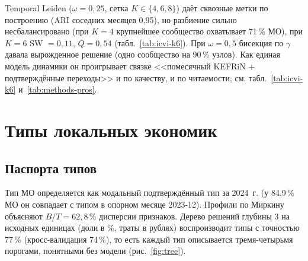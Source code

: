\documentclass[11pt,a4paper]{article}
\begin{document}
Temporal Leiden ($\omega=0{,}25$, сетка $K\in\{4,6,8\}$) даёт сквозные метки по построению (ARI соседних месяцев 0,95), но разбиение сильно несбалансировано (при $K=4$ крупнейшее сообщество охватывает 71\,\% МО), при $K=6$ SW $=0{,}11$, $Q=0{,}54$ (табл.~\ref{tab:icvi-k6}). При $\omega=0{,}5$ бисекция по $\gamma$ давала вырожденное решение (одно сообщество на 90\,\% узлов). Как единая модель динамики он проигрывает связке <<помесячный KEFRiN + подтверждённые переходы>> и по качеству, и по читаемости; см. табл.~\ref{tab:icvi-k6} и~\ref{tab:methods-pros}.

\section{Типы локальных экономик}\label{sec:types}

\subsection{Паспорта типов}\label{sec:passports}

Тип МО определяется как модальный подтверждённый тип за 2024~г. (у 84,9\,\% МО он совпадает с типом в опорном месяце 2023-12). Профили по Миркину \cite{mirkin-book} объясняют $B/T=62{,}8$\,\% дисперсии признаков. Дерево решений глубины 3 на исходных единицах (доли в \%, траты в рублях) воспроизводит типы с точностью 77\,\% (кросс-валидация 74\,\%), то есть каждый тип описывается тремя-четырьмя порогами, понятными без модели (рис.~\ref{fig:tree}).
\end{document}
